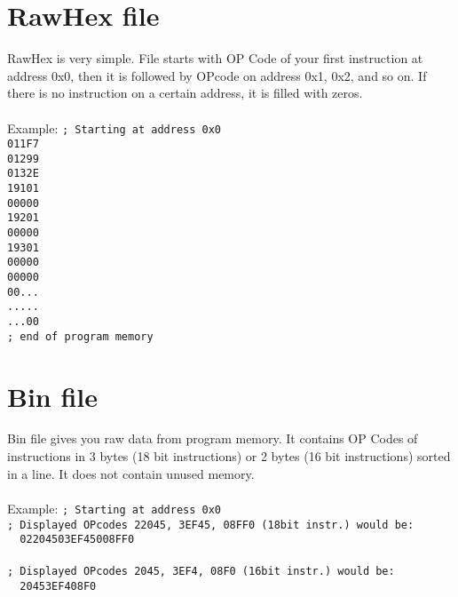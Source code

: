         \section{RawHex file}
            RawHex is very simple. File starts with OP Code of your first instruction at address 0x0, then it is followed by OPcode on address 0x1, 0x2, and so on. If there is no instruction on a certain address, it is filled with zeros.\\\\
             Example:
            {
                \usecodefont
                \verb'; Starting at address 0x0'\\
                \verb'011F7'\\
                \verb'01299'\\
                \verb'0132E'\\
                \verb'19101'\\
                \verb'00000'\\
                \verb'19201'\\
                \verb'00000'\\
                \verb'19301'\\
                \verb'00000'\\
                \verb'00000'\\
                \verb'00...'\\
                \verb'.....'\\
                \verb'...00'\\
                \verb'; end of program memory'\\
            }

        \section{Bin file}
            Bin file gives you raw data from program memory. It contains OP Codes of instructions in 3 bytes (18 bit instructions) or 2 bytes (16 bit instructions) sorted in a line. It does not contain unused memory.\\\\
            Example:
            {
                \usecodefont
                \verb'; Starting at address 0x0'\\
                \verb'; Displayed OPcodes 22045, 3EF45, 08FF0 (18bit instr.) would be:'\\
                \verb'  02204503EF45008FF0 '\\\\
                \verb'; Displayed OPcodes 2045, 3EF4, 08F0 (16bit instr.) would be:'\\
                \verb'  20453EF408F0 '\\
            }

